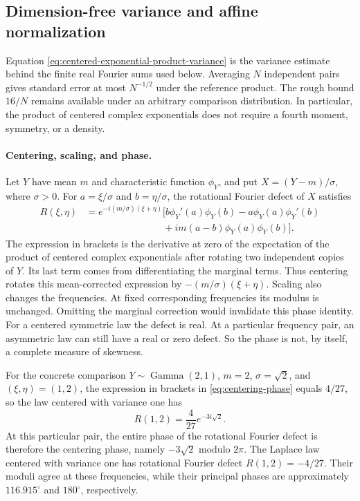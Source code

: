 \subsection{Dimension-free variance and affine normalization}
\label{sec:variance-and-affine-normalization}

Equation \eqref{eq:centered-exponential-product-variance} is the variance
estimate behind the finite real Fourier sums used below.
Averaging \(N\) independent pairs gives standard error at most \(N^{-1/2}\)
under the reference product.
The rough bound \(16/N\) remains available under an arbitrary
comparison distribution.
In particular, the product of centered complex exponentials does not require
a fourth moment, symmetry, or a density.

\paragraph{Centering, scaling, and phase.}
Let $Y$ have mean \(m\) and characteristic function \(\phi_Y\), and put
\(X=(Y-m)/\sigma\), where \(\sigma>0\).
For \(a=\xi/\sigma\) and \(b=\eta/\sigma\), the rotational Fourier defect
of $X$ satisfies
\begin{equation}
 \begin{aligned}
 R(\xi,\eta)
 &=e^{-i(m/\sigma)(\xi+\eta)}
 \bigl[b\phi_Y'(a)\phi_Y(b)-a\phi_Y(a)\phi_Y'(b)\\
 &\hspace{8em}+im(a-b)\phi_Y(a)\phi_Y(b)\bigr].
 \end{aligned}
 \label{eq:centering-phase}
\end{equation}
The expression in brackets is the derivative at zero of the expectation of
the product of centered complex exponentials after rotating two independent
copies of $Y$.
Its last term comes from differentiating the marginal terms.
Thus centering rotates this mean-corrected expression by
\(-(m/\sigma)(\xi+\eta)\).
Scaling also changes the frequencies.
At fixed corresponding frequencies its modulus is unchanged.
Omitting the marginal correction would invalidate this phase identity.
For a centered symmetric law the defect is real.
At a particular frequency pair, an asymmetric law can still have a real or
zero defect.
So the phase is not, by itself, a complete measure of skewness.

For the concrete comparison $Y\sim\operatorname{Gamma}(2,1)$,
$m=2$, $\sigma=\sqrt2$, and $(\xi,\eta)=(1,2)$, the expression in brackets in
\eqref{eq:centering-phase} equals $4/27$, so the law centered with variance one has
\[
 R(1,2)=\frac4{27}e^{-3i\sqrt2}.
\]
At this particular pair, the entire phase of the rotational Fourier defect is
therefore the centering phase, namely $-3\sqrt2$ modulo $2\pi$.
The Laplace law centered with variance one has rotational Fourier defect $R(1,2)=-4/27$.
Their moduli agree at these frequencies, while their principal phases
are approximately $116.915^\circ$ and $180^\circ$, respectively.
